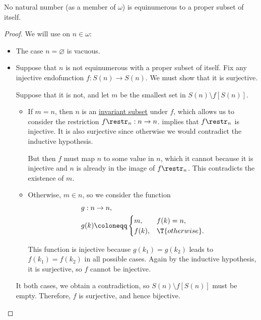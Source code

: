 \begin{lemma}\label{thm:natural_number_is_not_equinumerous_to_proper_subset}
  No natural number (as a member of \hyperref[def:smallest_inductive_set]{\( \omega \)}) is equinumerous to a proper subset of itself.
\end{lemma}
\begin{proof}
  We will use  on \( n \in \omega \):
  \begin{itemize}
    \item The case \( n = \varnothing \) is vacuous.
    \item Suppose that \( n \) is not equinumerous with a proper subset of itself. Fix any injective endofunction \( f: S(n) \to S(n) \). We must show that it is surjective.

    Suppose that it is not, and let \( m \) be the smallest set in \( S(n) \setminus f[S(n)] \).
    \begin{itemize}
      \item If \( m = n \), then \( n \) is an \hyperref[def:invariant_subset]{invariant subset} under \( f \), which allows us to consider the restriction \( f\restr_n: n \to n \).  implies that \( f\restr_n \) is injective. It is also surjective since otherwise we would contradict the inductive hypothesis.

      But then \( f \) must map \( n \) to some value in \( n \), which it cannot because it is injective and \( n \) is already in the image of \( f\restr_n \). This contradicts the existence of \( m \).

      \item Otherwise, \( m \in n \), so we consider the function
      \begin{equation*}
        \begin{aligned}
          &g: n \to n, \\
          &g(k) \coloneqq \begin{cases}
            m,    &f(k) = n, \\
            f(k), &\T{otherwise}.
          \end{cases}
        \end{aligned}
      \end{equation*}

      This function is injective because \( g(k_1) = g(k_2) \) leads to \( f(k_1) = f(k_2) \) in all possible cases. Again by the inductive hypothesis, it is surjective, so \( f \) cannot be injective.
    \end{itemize}

    It both cases, we obtain a contradiction, so \( S(n) \setminus f[S(n)] \) must be empty. Therefore, \( f \) is surjective, and hence bijective.
  \end{itemize}
\end{proof}


